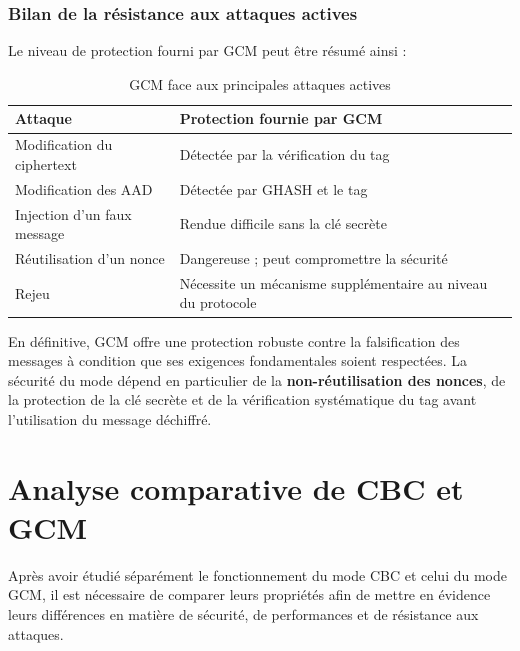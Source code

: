 \documentclass[12pt,a4paper]{article}
\begin{document}
\subsubsection{Bilan de la résistance aux attaques actives}

Le niveau de protection fourni par GCM peut être résumé ainsi :

\begin{table}[htbp]
\centering
\caption{GCM face aux principales attaques actives}
\label{tab:gcm_attaques}
\begin{tabular}{p{5cm}p{7cm}}
\toprule
\textbf{Attaque} & \textbf{Protection fournie par GCM} \\
\midrule
Modification du ciphertext
& Détectée par la vérification du tag \\

Modification des AAD
& Détectée par GHASH et le tag \\

Injection d'un faux message
& Rendue difficile sans la clé secrète \\

Réutilisation d'un nonce
& Dangereuse ; peut compromettre la sécurité \\

Rejeu
& Nécessite un mécanisme supplémentaire au niveau du protocole \\
\bottomrule
\end{tabular}
\end{table}

En définitive, GCM offre une protection robuste contre la falsification
des messages à condition que ses exigences fondamentales soient
respectées. La sécurité du mode dépend en particulier de la
\textbf{non-réutilisation des nonces}, de la protection de la clé
secrète et de la vérification systématique du tag avant l'utilisation
du message déchiffré.



\section{Analyse comparative de CBC et GCM}
\label{sec:comparaison_cbc_gcm}

Après avoir étudié séparément le fonctionnement du mode CBC et celui
du mode GCM, il est nécessaire de comparer leurs propriétés afin de
mettre en évidence leurs différences en matière de sécurité, de
performances et de résistance aux attaques.
\end{document}

